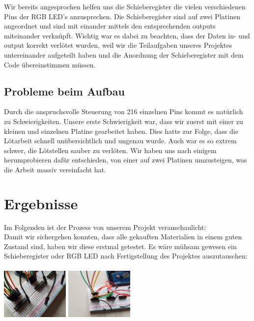 \documentclass[12pt,a4paper]{article}
\begin{document}
Wir bereits angesprochen helfen uns die Schieberegister die vielen verschiedenen Pins der RGB LED's anzusprechen. Die Schieberegister sind auf zwei Platinen angeordnet und sind mit einander mittels den entsprechenden outputs miteinander verknüpft. Wichtig war es dabei zu beachten, dass der Daten in- und output korrekt verlötet wurden, weil wir die Teilaufgaben unseres Projektes untereinander aufgeteilt haben und die Anordnung der Schieberegister mit dem Code übereinstimmen müssen.

\subsection{Probleme beim Aufbau}

Durch die anspruchsvolle Steuerung von 216 einzelnen Pins kommt es natürlich zu Schwierigkeiten. Unsere erste Schwierigkeit war, dass wir  zuerst mit einer zu kleinen und einzelnen Platine gearbeitet haben. Dies hatte zur Folge, dass die Lötarbeit schnell unübersichtlich und ungenau wurde. Auch war es so extrem schwer, die Lötstellen sauber zu verlöten. Wir haben uns nach einigem herumprobieren dafür entschieden, von einer auf zwei Platinen umzusteigen, was die Arbeit massiv vereinfacht hat.

\newpage
\section{Ergebnisse}

Im Folgenden ist der Prozess von unserem Projekt veranschaulicht: \\

Damit wir sichergehen konnten, dass alle gekauften Materialien in einem guten Zustand sind, haben wir diese erstmal 
getestet. Es wäre mühsam gewesen ein Schieberegister oder RGB LED nach Fertigstellung des Projektes auszutauschen: \\\\
\includegraphics[width=0.25\textwidth]{CAOSProject3.jpg}
\includegraphics[width=0.25\textwidth]{CAOSProject5.jpg} \\
\end{document}
